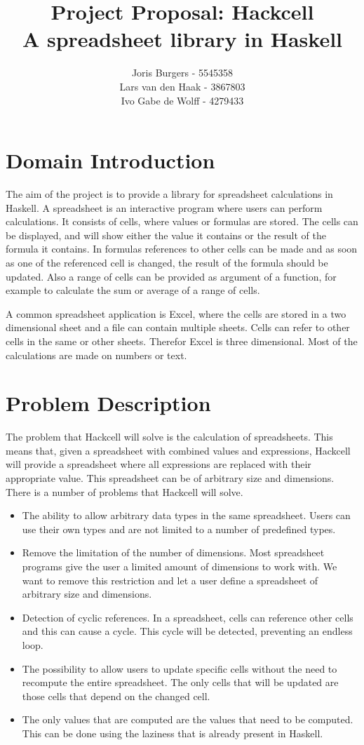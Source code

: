 \documentclass{article}
\title{
	\vskip -3cm
	Project Proposal: Hackcell \\
	\vskip 0.5cm
	\large{A spreadsheet library in Haskell}
}
\author{Joris Burgers - 5545358\\ Lars van den Haak - 3867803\\ Ivo Gabe de Wolff - 4279433}
\begin{document}
	\maketitle
	\section{Domain Introduction}
	The aim of the project is to provide a library for spreadsheet calculations in Haskell. A spreadsheet is an interactive program where users can perform calculations. It consists of cells, where values or formulas are stored. The cells can be displayed, and will show either the value it contains or the result of the formula it contains. In formulas references to other cells can be made and as soon as one of the referenced cell is changed, the result of the formula should be updated. Also a range of cells can be provided as argument of a function, for example to calculate the sum or average of a range of cells. 
	
	A common spreadsheet application is Excel, where the cells are stored in a two dimensional sheet and a file can contain multiple sheets. Cells can refer to other cells in the same or other sheets. Therefor Excel is three dimensional. Most of the calculations are made on numbers or text. 
	
	\section{Problem Description}
	The problem that Hackcell will solve is the calculation of spreadsheets. This means that, given a spreadsheet with combined values and expressions, Hackcell will provide a spreadsheet where all expressions are replaced with their appropriate value. This spreadsheet can be of arbitrary size and dimensions. There is a number of problems that Hackcell will solve.
\begin{itemize}
	\item The ability to allow arbitrary data types in the same spreadsheet. Users can use their own types and are not limited to a number of predefined types. 
	\item Remove the limitation of the number of dimensions. Most spreadsheet programs give the user a limited amount of dimensions to work with. We want to remove this restriction and let a user define a spreadsheet of arbitrary size and dimensions.
	\item Detection of cyclic references. In a spreadsheet, cells can reference other cells and this can cause a cycle. This cycle will be detected, preventing an endless loop.
	\item The possibility to allow users to update specific cells without the need to recompute the entire spreadsheet. The only cells that will be updated are those cells that depend on the changed cell.
	\item The only values that are computed are the values that need to be computed. This can be done using the laziness that is already present in Haskell. 
\end{itemize}	
	
\end{document}
